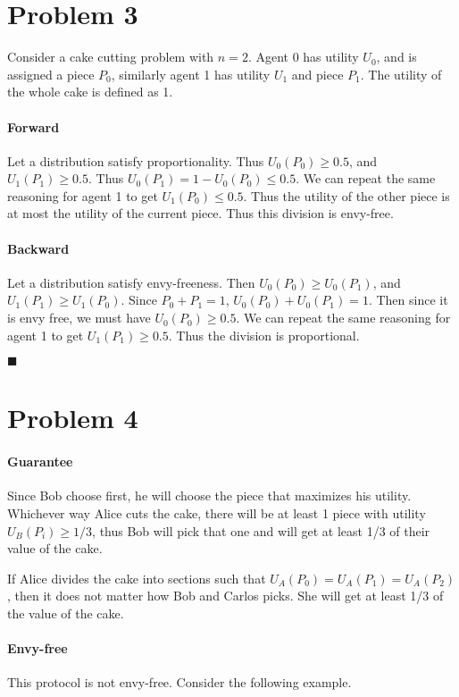 \documentclass[12pt]{article}
\begin{document}
\section*{Problem 3}
Consider a cake cutting problem with $n=2$. Agent 0 has utility $U_0$, and is assigned a piece $P_0$, 
similarly agent 1 has utility $U_1$ and piece $P_1$. The utility of the whole cake is defined as 1.

\paragraph*{Forward}
Let a distribution satisfy proportionality. Thus $U_0(P_0) \geq 0.5$, 
and $U_1(P_1) \geq 0.5$. Thus $U_0(P_1) = 1 - U_0(P_0) \leq 0.5$. We can repeat 
the same reasoning for agent 1 to get $U_1(P_0) \leq 0.5$. Thus the utility of the 
other piece is at most the utility of the current piece. Thus this division is 
envy-free.

\paragraph*{Backward}
Let a distribution satisfy envy-freeness. Then $U_0(P_0) \geq U_0(P_1)$, and 
$U_1(P_1) \geq U_1(P_0)$. Since $P_0 + P_1 = 1$, $U_0(P_0) + U_0(P_1) = 1$. Then since 
it is envy free, we must have $U_0(P_0) \geq 0.5$. We can repeat the same reasoning for 
agent 1 to get $U_1(P_1) \geq 0.5$. Thus the division is proportional.

$\blacksquare$
\newpage


\section*{Problem 4}
\paragraph*{Guarantee}
Since Bob choose first, he will choose the piece that maximizes his utility. 
Whichever way Alice cuts the cake, there will be at least 1 piece with utility 
$U_B(P_i) \geq 1/3$, thus Bob will pick that one and will get at least 1/3 of their value of the cake.

If Alice divides the cake into sections such that $U_A(P_0) = U_A(P_1) = U_A(P_2)$, then it does not matter 
how Bob and Carlos picks. She will get at least 1/3 of the value of the cake.

\paragraph*{Envy-free}
This protocol is not envy-free. Consider the following example.
\end{document}
